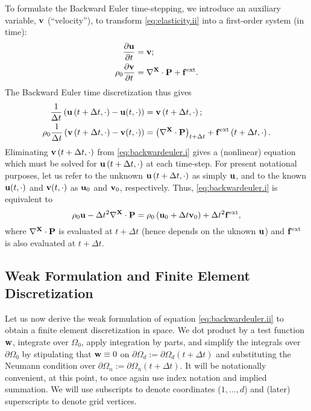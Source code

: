To formulate the Backward Euler time-stepping, we introduce an auxiliary variable, $\mathbf{v}$ (``velocity''), to transform \eqref{eq:elasticity.ii} into a first-order system (in time):
\begin{align*}
\frac{\partial \mathbf{u}}{\partial t} & = \mathbf{v}; \\
\rho_0 \frac{\partial \mathbf{v}}{\partial t} & = \nabla^{\mathbf{X}} \cdot \mathbf{P} + \mathbf{f}^{\text{ext}}.
\end{align*}
The Backward Euler time discretization thus gives
\begin{subequations}\label{eq:backwardeuler.i}
\begin{align}
\frac{1}{\Delta t} \left( \mathbf{u} \left( t + \Delta t, \cdot \right) - \mathbf{u}(t,\cdot) \right) & = \mathbf{v} \left( t + \Delta t, \cdot \right); \\
\rho_0 \frac{1}{\Delta t} \left( \mathbf{v} \left( t + \Delta t, \cdot \right) - \mathbf{v}(t,\cdot) \right) & = \left( \nabla^{\mathbf{X}} \cdot \mathbf{P} \right)_{t + \Delta t} + \mathbf{f}^{\text{ext}} \left( t + \Delta t, \cdot \right).
\end{align}
\end{subequations}
Eliminating $\mathbf{v} \left( t + \Delta t, \cdot \right)$ from \eqref{eq:backwardeuler.i} gives a (nonlinear) equation which must be solved for $\mathbf{u} \left( t + \Delta t, \cdot \right)$ at each time-step. For present notational purposes, let us refer to the unknown $\mathbf{u} \left( t + \Delta t, \cdot \right)$ as simply $\mathbf{u}$, and to the known $\mathbf{u}(t,\cdot)$ and $\mathbf{v}(t,\cdot)$ as $\mathbf{u}_0$ and $\mathbf{v}_0$, respectively. Thus, \eqref{eq:backwardeuler.i} is equivalent to
\begin{equation}\label{eq:backwardeuler.ii}
\rho_0 \mathbf{u} - \Delta t^2 \nabla^{\mathbf{X}} \cdot \mathbf{P} = \rho_0 \left( \mathbf{u}_0 + \Delta t \mathbf{v}_0 \right) + \Delta t^2 \mathbf{f}^{\text{ext}},
\end{equation}
where $\nabla^{\mathbf{X}} \cdot \mathbf{P}$ is evaluated at $t + \Delta t$ (hence depends on the uknown $\mathbf{u}$) and $\mathbf{f}^{\text{ext}}$ is also evaluated at $t + \Delta t$.

\subsection{Weak Formulation and Finite Element Discretization}

Let us now derive the weak formulation of equation \eqref{eq:backwardeuler.ii} to obtain a finite element discretization in space. We dot product by a test function $\mathbf{w}$, integrate over $\Omega_0$, apply integration by parts, and simplify the integrals over $\partial \Omega_0$ by stipulating that $\mathbf{w} \equiv 0$ on $\partial \Omega_d := \partial \Omega_d(t + \Delta t)$ and substituting the Neumann condition over $\partial \Omega_n := \partial \Omega_n(t + \Delta t)$. It will be notationally convenient, at this point, to once again use index notation and implied summation. We will use subscripts to denote coordinates ($1, \dotsc, d$) and (later) superscripts to denote grid vertices.

